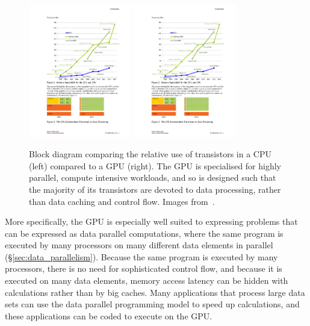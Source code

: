 \begin{figure}[tbp]
    \centering
    \includegraphics[width=0.4\textwidth]{images/sec-3/block_cpu}
    \includegraphics[width=0.4\textwidth]{images/sec-3/block_gpu}
    \caption[The GPU devotes more transistors to data processing]{Block diagram
    comparing the relative use of transistors in a CPU (left) compared to a GPU
    (right). The GPU is specialised for highly parallel, compute intensive
    workloads, and so is designed such that the majority of its transistors are
    devoted to data processing, rather than data caching and control flow.
    Images from~\cite{NVIDIA:2012wf}.}
    \label{fig:cpu_gpu_block_diagram}
\end{figure}

More specifically, the GPU is especially well suited to expressing problems that
can be expressed as data parallel computations, where the same program is
executed by many processors on many different data elements in parallel
(\S\ref{sec:data_parallelism}). Because the same program is executed by many
processors, there is no need for sophisticated control flow, and because it is
executed on many data elements, memory access latency can be hidden with
calculations rather than by big caches. Many applications that process large
data sets can use the data parallel programming model to speed up calculations,
and these applications can be coded to execute on the GPU.


